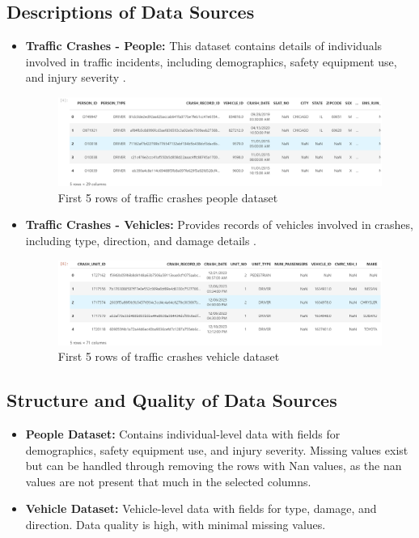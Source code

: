 \documentclass[a4paper,10pt]{article}
\begin{document}
\subsection{Descriptions of Data Sources}
\begin{itemize}
    \item \textbf{Traffic Crashes - People:} This dataset contains details of individuals involved in traffic incidents, including demographics, safety equipment use, and injury severity 
    .
    
    \begin{figure}
        \centering
        \includegraphics[width=1\linewidth]{images/dataset1.png}
        \caption{First 5 rows of traffic crashes people dataset}
        \label{fig:people}
    \end{figure}
    
    \item \textbf{Traffic Crashes - Vehicles:} Provides records of vehicles involved in crashes, including type, direction, and damage details .
    
    \begin{figure}
        \centering
        \includegraphics[width=1\linewidth]{images/dataset2.png}
        \caption{First 5 rows of traffic crashes vehicle dataset}
        \label{fig:vehicles}
    \end{figure}
\end{itemize}

\subsection{Structure and Quality of Data Sources}
\begin{itemize}
    \item \textbf{People Dataset:} Contains individual-level data with fields for demographics, safety equipment use, and injury severity. Missing values exist but can be handled through removing the rows with Nan values, as the nan values are not present that much in the selected columns.
    \item \textbf{Vehicle Dataset:} Vehicle-level data with fields for type, damage, and direction. Data quality is high, with minimal missing values.
\end{itemize}
\end{document}
